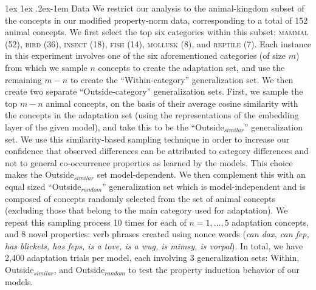\documentclass[10pt,letterpaper]{article}
\makeatletter
\renewcommand{\paragraph}{%
  \@startsection{paragraph}{4}%
  {\z@}{1ex \@plus 1ex \@minus .2ex}{-1em}%
  {\normalfont\normalsize\bfseries}%
}
\makeatother
\begin{document}
\paragraph{Data} We restrict our analysis to the animal-kingdom subset of the concepts in our modified property-norm data, corresponding to a total of 152 animal concepts.
We first select the top six categories within this subset: \textsc{mammal} (52), \textsc{bird} (36), \textsc{insect} (18), \textsc{fish} (14), \textsc{mollusk} (8), and \textsc{reptile} (7).
Each instance in this experiment involves one of the six aforementioned categories (of size $m$) from which we sample $n$ concepts to create the adaptation set, and use the remaining $m-n$ to create the ``Within-category'' generalization set.
We then create two separate ``Outside-category'' generalization sets.
First, we sample the top $m-n$ animal concepts, on the basis of their average cosine similarity with the concepts in the adaptation set (using the representations of the embedding layer of the given model), and take this to be the ``Outside$_{\textit{similar}}$'' generalization set.
We use this similarity-based sampling technique in order to increase our confidence that observed differences can be attributed to category differences and not to general co-occurrence properties as learned by the models. This choice makes the Outside$_{\textit{similar}}$ set model-dependent.
We then complement this with an equal sized ``Outside$_{\textit{random}}$'' generalization set which is model-independent and is composed of concepts randomly selected from the set of animal concepts (excluding those that belong to the main category used for adaptation).
We repeat this sampling process 10 times for each of $n = 1, \dots, 5$ adaptation concepts, and 8 novel properties: verb phrases created using nonce words (\textit{can dax, can fep, has blickets, has feps, is a tove, is a wug, is mimsy, is vorpal}). In total, we have 2{,}400 adaptation trials per model, each involving 3 generalization sets: Within, Outside$_{\textit{similar}}$, and Outside$_{\textit{random}}$ to test the property induction behavior of our models. 
\end{document}
